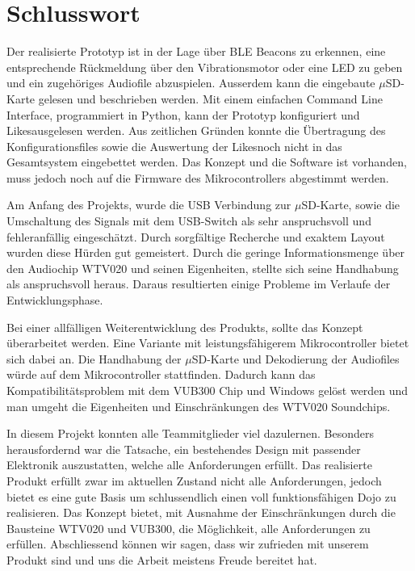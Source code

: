 \chapter{Schlusswort}
\label{Schlusswort}
\thispagestyle{fancy}  

Der realisierte Prototyp ist in der Lage über BLE Beacons zu erkennen, eine entsprechende Rückmeldung über den Vibrationsmotor oder eine LED zu geben und ein zugehöriges Audiofile abzuspielen. Ausserdem kann die eingebaute $\mu$SD-Karte gelesen und beschrieben werden. Mit einem einfachen Command Line Interface, programmiert in Python, kann der Prototyp konfiguriert und \flq Likes\frq ausgelesen werden. Aus zeitlichen Gründen konnte die Übertragung des Konfigurationsfiles sowie die Auswertung der \flq Likes\frq noch nicht in das Gesamtsystem eingebettet werden. Das Konzept und die Software ist vorhanden, muss jedoch noch auf die Firmware des Mikrocontrollers abgestimmt werden.

Am Anfang des Projekts, wurde die USB Verbindung zur $\mu$SD-Karte, sowie die Umschaltung des Signals mit dem USB-Switch als sehr anspruchsvoll und fehleranfällig eingeschätzt. Durch sorgfältige Recherche und exaktem Layout wurden diese Hürden gut gemeistert. Durch die geringe Informationsmenge über den Audiochip WTV020 und seinen Eigenheiten, stellte sich seine Handhabung als anspruchsvoll heraus. Daraus resultierten einige Probleme im Verlaufe der Entwicklungsphase.

Bei einer allfälligen Weiterentwicklung des Produkts, sollte das Konzept überarbeitet werden. Eine Variante mit leistungsfähigerem Mikrocontroller bietet sich dabei an. Die Handhabung der $\mu$SD-Karte und Dekodierung der Audiofiles würde auf dem Mikrocontroller stattfinden. Dadurch kann das Kompatibilitätsproblem mit dem VUB300 Chip und Windows gelöst werden und man umgeht die Eigenheiten und Einschränkungen des WTV020 Soundchips.

In diesem Projekt konnten alle Teammitglieder viel dazulernen. Besonders herausfordernd war die Tatsache, ein bestehendes Design mit passender Elektronik auszustatten, welche alle Anforderungen erfüllt. Das realisierte Produkt erfüllt zwar im aktuellen Zustand nicht alle Anforderungen, jedoch bietet es eine gute Basis um schlussendlich einen voll funktionsfähigen Dojo zu realisieren. Das Konzept bietet, mit Ausnahme der Einschränkungen durch die Bausteine WTV020 und VUB300, die Möglichkeit, alle Anforderungen zu erfüllen. Abschliessend können wir sagen, dass wir zufrieden mit unserem Produkt sind und uns die Arbeit meistens Freude bereitet hat.
